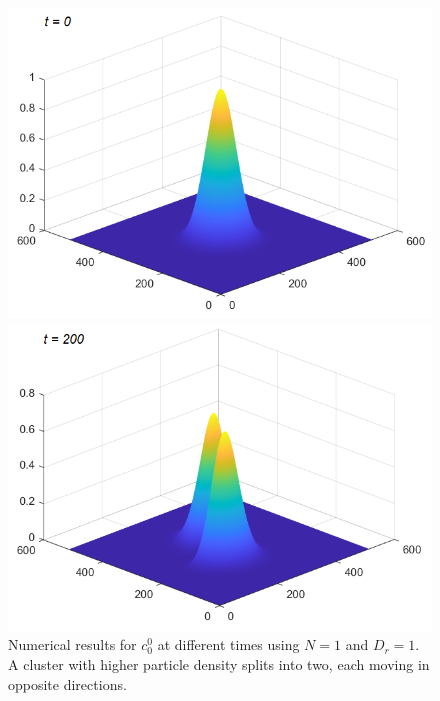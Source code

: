 \begin{frame}
	\begin{figure}[H]
	\centering
	\begin{minipage}{0.4\textwidth}
		\includegraphics[scale=0.3]{Bilder_wxwy/t=0_wxwy=1_wxwy=-1}
	\end{minipage}
	\hfill 
	\begin{minipage}{0.4\textwidth}
		\includegraphics[scale=0.3]{Bilder_wxwy/t=200_wxwy=1_wxwy=-1}
	\end{minipage}
   \caption{Numerical results for $c^0_0$ at different times using $N=1$ and $D_r=1$. A cluster with higher particle density splits into two, each moving in opposite directions.}
    \end{figure}
\end{frame}

